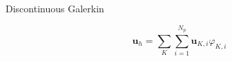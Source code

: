 \documentclass[24pt,t,table, aspectratio=169]{beamer}
\newcommand{\vecu}{\mathbf{u}}
\newcommand{\vece}{\mathbf{e}}
\begin{document}
\begin{frame}{Discontinuous Galerkin}
\begin{minipage}{0.69\linewidth}
\begin{tikzpicture}[scale = 1.]

\end{tikzpicture}
\end{minipage}
\begin{minipage}{0.29\linewidth}
\begin{equation*}
\vecu_h = \sum_K \sum_{i=1}^{N_p} \vecu_{K,i} \varphi_{K,i}
\end{equation*}
\end{minipage}



\end{frame}
\end{document}
